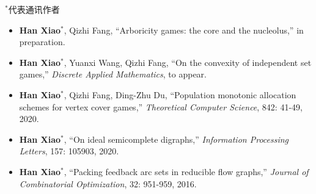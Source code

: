 %
%


$^*$代表通讯作者
\begin{itemize}
	\item \textbf{Han Xiao}$^*$, Qizhi Fang, ``Arboricity games: the core and the nucleolus,'' in preparation.\\
	 { \footnotesize {}}
	\item \textbf{Han Xiao}$^*$, Yuanxi Wang, Qizhi Fang, ``On the convexity of independent set games,''
	\emph{Discrete Applied Mathematics}, to appear.\\
	 { \footnotesize {}}
	\item \textbf{Han Xiao}$^*$, Qizhi Fang, Ding-Zhu Du, ``Population monotonic allocation schemes for vertex cover games,''
	\emph{Theoretical Computer Science}, 842: 41-49, 2020.\\
	 { \footnotesize {}}
	 \item \textbf{Han Xiao}$^*$, ``On ideal semicomplete digraphs,''
	\emph{Information Processing Letters}, 157: 105903, 2020.\\
	 { \footnotesize {}}
	\item \textbf{Han Xiao}$^*$, ``Packing feedback arc sets in reducible flow graphs,''
	\emph{Journal of Combinatorial Optimization}, 32: 951-959, 2016.\\
	 { \footnotesize {}}
\end{itemize}